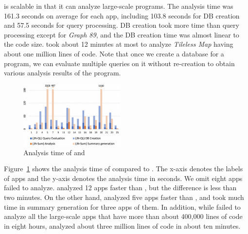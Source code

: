 \ours is scalable in that it can analyze large-scale programs. 
The analysis time was 161.3 seconds on average for each app, including 103.8
seconds for DB creation and 57.5 seconds for query processing.  
DB creation took more time than query processing except for {\it Graph 89}, and
the DB creation time was almost linear to the code size. 
\ours took about 12 minutes at most to analyze {\it Tileless Map} having about
one million lines of code.
Note that once we create a database for a program, we can evaluate multiple
queries on it without re-creation to obtain various analysis results of the
program.

\begin{figure}[t]
  \centering
  \vspace{2mm}
  \includegraphics[width=0.47\textwidth]{img/graph}
  \vspace*{-.5em}
  \caption{Analysis time of \ours and \lees}
  \label{fig:graph}
\vspace*{-1em}
\end{figure}

Figure~\ref{fig:graph} shows the analysis time of \ours compared to \lees.
The x-axis denotes the labels of apps and the y-axis denotes the analysis time
in seconds. We omit eight apps \lees failed to analyze.
\lees analyzed 12 apps faster than \ours, but the difference is less than two
minutes. 
On the other hand, \ours analyzed five apps faster than \lees, and \lees took
much time in summary generation for three apps of them. 
In addition, while \lees failed to analyze all the large-scale apps that have
more than about 400,000 lines of code in eight hours, \ours analyzed about
three million lines of code in about ten minutes.

